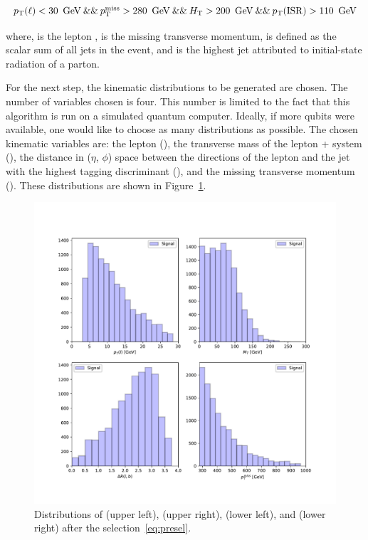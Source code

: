 \begin{linenomath}
\begin{equation}
\resizebox{\hsize}{!}{$\ptl < 30~\GeV\:\&\&\:\ptmiss > 280~\GeV\:\&\&\:\HT > 200~\GeV\:\&\&\:\ptisr>110~\GeV$}
\label{eq:presel}
\end{equation}
\end{linenomath}
where, \ptl is the lepton \pt, \ptmiss is the missing transverse momentum, \HT is
defined as the scalar \pt sum of all jets in the event, and \ptisr is the highest 
jet \pt attributed to initial-state radiation of a parton.

For the next step, the kinematic distributions to be generated are chosen. The 
number of variables chosen is four. This number is limited to the fact that this
algorithm is run on a simulated quantum computer. Ideally, if more qubits were
available, one would like to choose as many distributions as possible. The 
chosen kinematic variables are: the lepton \pt (\ptl), the transverse mass of 
the lepton + \ptvecmiss system (\mt), the distance in ($\eta$, $\phi$) space 
between the directions of the lepton and the jet with the highest \cPqb tagging
discriminant (\drLB), and the missing transverse momentum (\ptmiss). 
These distributions are shown in Figure~\ref{fig:features}.

\begin{figure}[!htbp]
\centering
    \includegraphics[width=1\textwidth]{figures/features.pdf}
\caption{Distributions of \ptl (upper left), \mt (upper right), \drLB 
    (lower left), and \ptmiss (lower right) after the selection~\ref{eq:presel}.}
\label{fig:features}
\end{figure}

